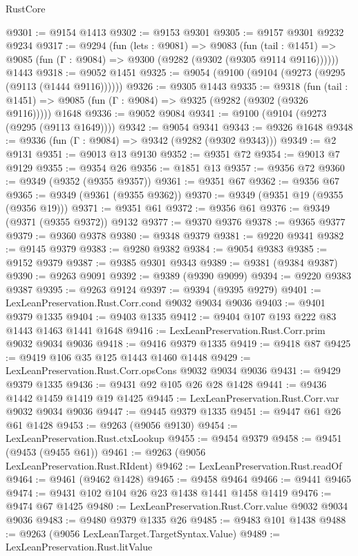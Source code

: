 \begin{lexlean}{RustCore}
\begin{coremodule}
@9301 := @9154 @1413
@9302 := @9153 @9301
@9305 := @9157 @9301 @9232 @9234
@9317 := @9294
    (fun (lets : @9081) =>
    @9083
      (fun (tail : @1451) => @9085 (fun (Γ : @9084) => @9300 (@9282 (@9302 (@9305 @9114 @9116))))))
    @1443
@9318 := @9052 @1451
@9325 := @9054 (@9100 (@9104 (@9273 (@9295 (@9113 (@1444 @9116))))))
@9326 := @9305 @1443
@9335 := @9318
    (fun (tail : @1451) => @9085 (fun (Γ : @9084) => @9325 (@9282 (@9302 (@9326 @9116)))))
    @1648
@9336 := @9052 @9084
@9341 := @9100 (@9104 (@9273 (@9295 (@9113 @1649))))
@9342 := @9054 @9341
@9343 := @9326 @1648
@9348 := @9336 (fun (Γ : @9084) => @9342 (@9282 (@9302 @9343)))
@9349 := @2 @9131
@9351 := @9013 @13 @9130
@9352 := @9351 @72
@9354 := @9013 @7 @9129
@9355 := @9354 @26
@9356 := @1851 @13
@9357 := @9356 @72
@9360 := @9349 (@9352 (@9355 @9357))
@9361 := @9351 @67
@9362 := @9356 @67
@9365 := @9349 (@9361 (@9355 @9362))
@9370 := @9349 (@9351 @19 (@9355 (@9356 @19)))
@9371 := @9351 @61
@9372 := @9356 @61
@9376 := @9349 (@9371 (@9355 @9372)) @9132
@9377 := @9370 @9376
@9378 := @9365 @9377
@9379 := @9360 @9378
@9380 := @9348 @9379
@9381 := @9220 @9341
@9382 := @9145 @9379
@9383 := @9280 @9382
@9384 := @9054 @9383
@9385 := @9152 @9379
@9387 := @9385 @9301 @9343
@9389 := @9381 (@9384 @9387)
@9390 := @9263 @9091
@9392 := @9389 (@9390 @9099)
@9394 := @9220 @9383 @9387
@9395 := @9263 @9124
@9397 := @9394 (@9395 @9279)
@9401 := LexLeanPreservation.Rust.Corr.cond @9032 @9034 @9036
@9403 := @9401 @9379 @1335
@9404 := @9403 @1335
@9412 := @9404 @107 @193 @222 @83 @1443 @1463 @1441 @1648
@9416 := LexLeanPreservation.Rust.Corr.prim @9032 @9034 @9036
@9418 := @9416 @9379 @1335
@9419 := @9418 @87
@9425 := @9419 @106 @35 @125 @1443 @1460 @1448
@9429 := LexLeanPreservation.Rust.Corr.opsCons @9032 @9034 @9036
@9431 := @9429 @9379 @1335
@9436 := @9431 @92 @105 @26 @28 @1428
@9441 := @9436 @1442 @1459 @1419 @19 @1425
@9445 := LexLeanPreservation.Rust.Corr.var @9032 @9034 @9036
@9447 := @9445 @9379 @1335
@9451 := @9447 @61 @26 @61 @1428
@9453 := @9263 (@9056 @9130)
@9454 := LexLeanPreservation.Rust.ctxLookup
@9455 := @9454 @9379
@9458 := @9451 (@9453 (@9455 @61))
@9461 := @9263 (@9056 LexLeanPreservation.Rust.RIdent)
@9462 := LexLeanPreservation.Rust.readOf
@9464 := @9461 (@9462 @1428)
@9465 := @9458 @9464
@9466 := @9441 @9465
@9474 := @9431 @102 @104 @26 @23 @1438 @1441 @1458 @1419
@9476 := @9474 @67 @1425
@9480 := LexLeanPreservation.Rust.Corr.value @9032 @9034 @9036
@9483 := @9480 @9379 @1335 @26
@9485 := @9483 @101 @1438
@9488 := @9263 (@9056 LexLeanTarget.TargetSyntax.Value)
@9489 := LexLeanPreservation.Rust.litValue

\end{coremodule}
\end{lexlean}
